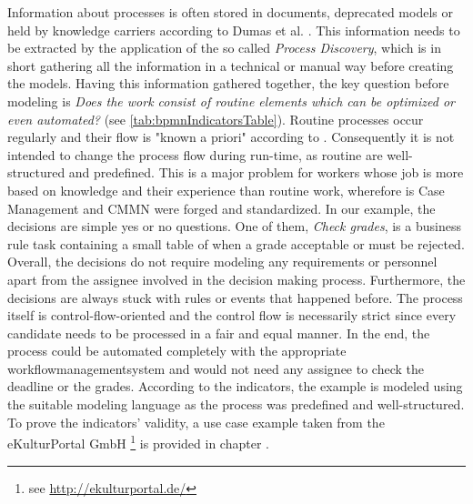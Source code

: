 Information about processes is often stored in documents, deprecated models or held by knowledge carriers according to Dumas et al. \cite{Dumas2013}. This information needs to be extracted by the application of the so called \textit{Process Discovery}, which is in short gathering all the information in a technical or manual way before creating the models. Having this information gathered together, the key question before modeling is \textit{Does the work consist of routine elements which can be optimized or even automated?} (see \ref{tab:bpmnIndicatorsTable}). Routine processes occur regularly and their flow is "known a priori" according to \cite{Zeising_2014}. Consequently it is not intended to change the process flow during run-time, as routine are well-structured and predefined. This is a major problem for workers whose job is more based on knowledge and their experience than routine work, wherefore is Case Management and CMMN were forged and standardized. 
In our example, the decisions are simple yes or no questions. One of them, \textit{Check grades}, is a business rule task containing a small table of when a grade acceptable or must be rejected. Overall, the decisions do not require modeling any requirements or personnel apart from the assignee involved in the decision making process. Furthermore, the decisions are always stuck with rules or events that happened before. The process itself is control-flow-oriented and the control flow is necessarily strict since every candidate needs to be processed in a fair and equal manner. In the end, the process could be automated completely with the appropriate workflowmanagementsystem and would not need any assignee to check the deadline or the grades. 
According to the indicators, the example is modeled using the suitable modeling language as the process was predefined and well-structured. To prove the indicators' validity, a use case example taken from the eKulturPortal GmbH \footnote{see \url{http://ekulturportal.de/}} is provided in chapter . 

